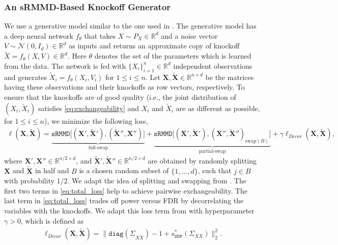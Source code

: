 \documentclass{article}
\theoremstyle{definition}
\newcommand{\srmmd}{\mathtt{sRMMD}}
\begin{document}
\subsubsection{An sRMMD-Based Knockoff Generator}\label{sec:architecture} 
We use a generative model similar to the one used in \cite{romano2020deep}. The generative model has a deep neural network $f_\theta$ that takes $X\sim P_X\in \mathbb R^d$ and a noise vector $V\sim \mathcal N(0, I_d)\in \mathbb R^d$ as inputs and returns an approximate copy of knockoff $\tilde X = f_\theta(X, V)\in \mathbb R^d$. Here $\theta$ denotes the set of the parameters which is learned from the data. The network is fed with $\{X_i\}_{i=1}^n\in \mathbb R^d$ independent observations and generates $\tilde X_i= f_{\theta}(X_i, V_i)$ for $1\leq i\leq n$. Let $\mathbf X, \tilde{\mathbf X}\in \mathbb R^{n\times d}$ be the matrices having these observations and their knockoffs as row vectors, respectively. To ensure that the knockoffs are of good quality (i.e., the joint distribution of $(X_i, \tilde X_i)$ satisfies \eqref{eq:exchangeability} and $X_i$ and $\tilde X_i$ are as different as possible, for $1\leq i\leq n$), we minimize the following loss,
\begin{align}\label{eq:total_loss}
    \ell(\mathbf X, \tilde {\mathbf X})\! =\! \underbrace{\srmmd \Big [ (\mathbf X',\! \tilde{\mathbf X}'),\! (\tilde{\mathbf X}'', \mathbf X'')\Big]}_{\text{full-swap}}+ \underbrace{\srmmd \Big [ (\mathbf X',\! \tilde{\mathbf X}'), (\mathbf X'', \tilde{\mathbf X}'')_{\text{swap}(B)}\Big]}_{\text{partial-swap}}\! +\! \gamma \ell_{Decor}(\mathbf X, \tilde{\mathbf X}),
\end{align}
where $\mathbf X', \mathbf X''\in \mathbb R^{n/2\times d}$, and $\mathbf {\tilde X}', \mathbf {\tilde X}''\in\mathbb R^{n/2 \times d} $ are obtained by randomly splitting $\mathbf X$ and $\mathbf {\tilde X}$ in half and $B$ is a chosen random subset of {\small $\{1, \dots, d\}$}, such that $j\in B$ with probability $1/2$. We adapt the idea of splitting and swapping from \cite{romano2020deep}. The first two terms in \eqref{eq:total_loss} help to achieve pairwise exchangeability. The last term in \eqref{eq:total_loss} trades off power versus FDR by decorrelating the
variables with the knockoffs. We adapt this loss term from \cite{romano2020deep} with hyperparameter $\gamma>0$, which is defined as
\begin{align*}
    \ell_{Decor}(\mathbf X, \tilde{\mathbf X}) =  \|\mathtt{diag}( \Sigma_{ X \tilde {X}}) - 1 + s^*_{\mathtt{SDP}}(\Sigma_{ X X})\|_2^2.
\end{align*}
\end{document}

